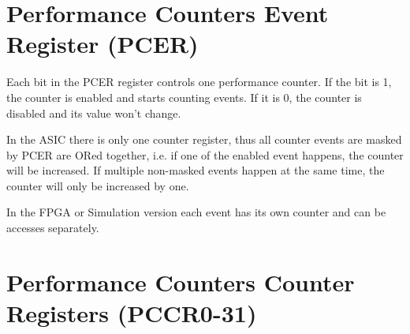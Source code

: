 \section{Performance Counters Event Register (PCER)}


Each bit in the PCER register controls one performance counter. If the bit is
1, the counter is enabled and starts counting events. If it is 0, the counter
is disabled and its value won't change.

In the ASIC there is only one counter register, thus all counter events are
masked by PCER are ORed together, i.e. if one of the enabled event happens,
the counter will be increased. If multiple non-masked events happen at the same
time, the counter will only be increased by one.

In the FPGA or Simulation version each event has its own counter and can be
accesses separately.


\section{Performance Counters Counter Registers (PCCR0-31)}

